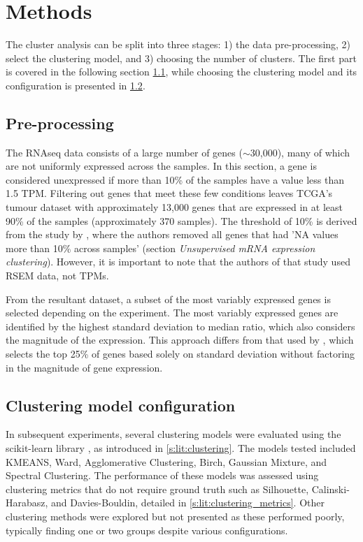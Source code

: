 \section{Methods} \label{s:cs:methods}



The cluster analysis can be split into three stages: 1) the data pre-processing, 2) select the clustering model, and 3) choosing the number of clusters. The first part is covered in the following section \ref{s:cs:pre-processing}, while choosing the clustering model and its configuration is presented in \cref{s:cs:right_config}.


\subsection{Pre-processing} \label{s:cs:pre-processing}

The RNAseq data consists of a large number of genes ($\sim$30,000), many of which are not uniformly expressed across the samples. In this section, a gene is considered unexpressed if more than 10\% of the samples have a value less than 1.5 TPM. Filtering out genes that meet these few conditions leaves TCGA's tumour dataset with approximately 13,000 genes that are expressed in at least 90\% of the samples (approximately 370 samples). The threshold of 10\% is derived from the study by \citet{Robertson2017-mg}, where the authors removed all genes that had 'NA values more than 10\% across samples' (section \textit{Unsupervised mRNA expression clustering}). However, it is important to note that the authors of that study used RSEM data, not TPMs.

From the resultant dataset, a subset of the most variably expressed genes is selected depending on the experiment. The most variably expressed genes are identified by the highest standard deviation to median ratio, which also considers the magnitude of the expression. This approach differs from that used by \citet{Robertson2017-mg}, which selects the top 25\% of genes based solely on standard deviation without factoring in the magnitude of gene expression.


\subsection{Clustering model configuration} \label{s:cs:right_config}

In subsequent experiments, several clustering models were evaluated using the scikit-learn library \citep{Scikit-learn_undated-ax}, as introduced in \cref{s:lit:clustering}. The models tested included \gls{KMEANS}, Ward, Agglomerative Clustering, Birch, Gaussian Mixture, and Spectral Clustering. The performance of these models was assessed using clustering metrics that do not require ground truth such as Silhouette, Calinski-Harabasz, and Davies-Bouldin, detailed in \cref{s:lit:clustering_metrics}. Other clustering methods were explored but not presented as these performed poorly, typically finding one or two groups despite various configurations.


